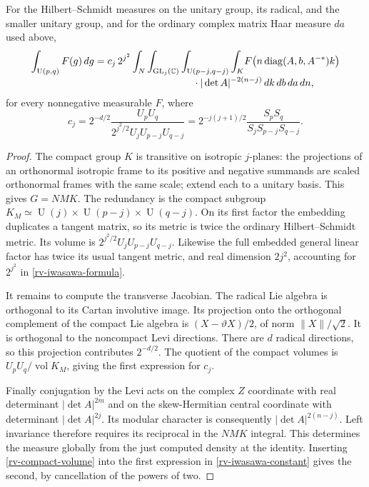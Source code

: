 \begin{lemma}\label{rv-iwasawa}
For the Hilbert--Schmidt measures on the unitary group,
its radical, and the smaller unitary group, and for the
ordinary complex matrix Haar measure $da$ used above,
\begin{equation}\label{rv-iwasawa-formula}
 \begin{split}
 \int_{\operatorname U(p,q)}F(g)\,dg
   =c_j\,2^{j^2}
       \int_N\int_{\operatorname{GL}_j(\mathbb C)}
       \int_{\operatorname U(p-j,q-j)}\int_K
       &F\bigl(n\operatorname{diag}(A,b,A^{-*})k\bigr)\\[-1mm]
       &\hspace{-18mm}\cdot|\det A|^{-2(n-j)}
                         \,dk\,db\,da\,dn ,
 \end{split}
\end{equation}
for every nonnegative measurable $F$, where
\begin{equation}\label{rv-iwasawa-constant}
 c_j=
 2^{-d/2}\frac{U_pU_q}
           {2^{j^2/2}U_jU_{p-j}U_{q-j}}
 =2^{-j(j+1)/2}
                \frac{S_pS_q}{S_jS_{p-j}S_{q-j}} .
\end{equation}
\end{lemma}
\begin{proof}
The compact group $K$ is transitive on isotropic
$j$-planes: the projections of an orthonormal isotropic
frame to its positive and negative summands are scaled
orthonormal frames with the same scale; extend each
to a unitary basis.  This gives $G=NMK$.
The redundancy is the compact subgroup
$K_M\simeq\operatorname U(j)\times
\operatorname U(p-j)\times\operatorname U(q-j)$.
On its first factor the embedding duplicates a tangent
matrix, so its metric is twice the ordinary
Hilbert--Schmidt metric.  Its volume is
$2^{j^2/2}U_jU_{p-j}U_{q-j}$.
Likewise the full embedded general linear factor has
twice its usual tangent metric, and real dimension
$2j^2$, accounting for $2^{j^2}$ in
\eqref{rv-iwasawa-formula}.

It remains to compute the transverse Jacobian.
The radical Lie algebra is orthogonal to its Cartan
involutive image.  Its projection onto the orthogonal
complement of the compact Lie algebra is
$(X-\vartheta X)/2$, of norm $\|X\|/\sqrt2$.
It is orthogonal to the noncompact Levi directions.
There are $d$ radical directions, so this projection
contributes $2^{-d/2}$.
The quotient of the compact volumes is $U_pU_q/\operatorname{vol}K_M$,
giving the first expression for $c_j$.

Finally conjugation by the Levi acts on the complex
$Z$ coordinate with real determinant
$|\det A|^{2m}$ and on the skew-Hermitian central
coordinate with determinant $|\det A|^{2j}$.
Its modular character is consequently
$|\det A|^{2(n-j)}$.
Left invariance therefore requires its reciprocal in
the $NMK$ integral.  This determines the measure
globally from the just computed density at the identity.
Inserting \eqref{rv-compact-volume} into the first
expression in \eqref{rv-iwasawa-constant} gives the
second, by cancellation of the powers of two.
\end{proof}

